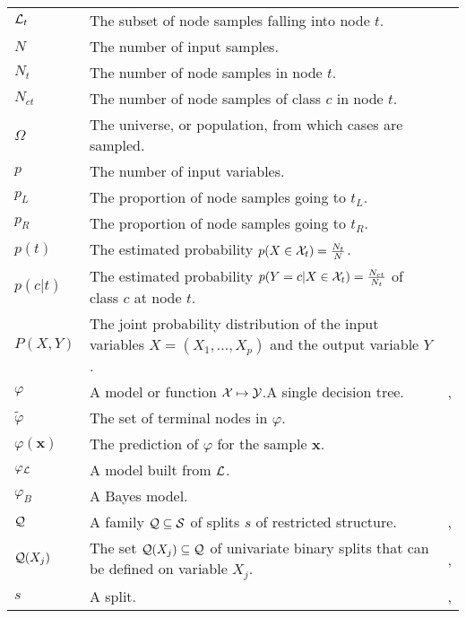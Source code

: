 {\begin{tabularx}{\textwidth}{ l X l }
${\cal L}_t$ & The subset of node samples falling into node $t$. & \pageref{ntn:L_t} \\
$N$ & The number of input samples. & \pageref{ntn:N} \\
$N_t$ & The number of node samples in node $t$. & \pageref{ntn:N_t} \\
$N_{ct}$ & The number of node samples of class $c$ in node $t$. & \pageref{ntn:N_ct} \\
$\Omega$ & The universe, or population, from which cases are sampled. & \pageref{ntn:omega} \\
$p$ & The number of input variables. & \pageref{ntn:p} \\
$p_L$ & The proportion of node samples going to $t_L$. & \pageref{ntn:p_L} \\
$p_R$ & The proportion of node samples going to $t_R$. & \pageref{ntn:p_R} \\
$p(t)$ & The estimated probability $p(X \in {\cal X}_t)=\tfrac{N_t}{N}$. & \pageref{ntn:p_t} \\
$p(c|t)$ & The estimated probability $p(Y=c | X \in {\cal X}_t)=\tfrac{N_{ct}}{N_t}$ of class $c$ at node $t$. & \pageref{ntn:p_ct} \\
$P(X,Y)$ & The joint probability distribution of the input variables $X=(X_1,\dots,X_p)$ and the output variable $Y$. & \pageref{ntn:P_XY} \\
$\varphi$ & A model or function ${\cal X} \mapsto {\cal Y}$.\newline A single decision tree. & \pageref{ntn:varphi}, \pageref{ntn:tree} \\
$\widetilde{\varphi}$ & The set of terminal nodes in $\varphi$. & \pageref{ntn:varphi-leafs}\\
$\varphi(\mathbf{x})$ & The prediction of $\varphi$ for the sample $\mathbf{x}$. & \pageref{ntn:varphi-x} \\
$\varphi_{\cal L}$ & A model built from ${\cal L}$. & \pageref{ntn:varphi-L} \\
$\varphi_B$ & A Bayes model. & \pageref{ntn:varphi-B} \\
${\cal Q}$ & A family ${\cal Q} \subseteq {\cal S}$ of splits $s$ of restricted structure. & \pageref{ntn:Q}, \pageref{ntn:Q2} \\
${\cal Q}(X_j)$ & The set ${\cal Q}(X_j) \subseteq {\cal Q}$ of univariate binary splits that can be defined on variable $X_j$. & \pageref{ntn:Q_X_j}, \pageref{ntn:Q_X_j2} \\
$s$ & A split. & \pageref{ntn:s}, \pageref{ntn:s2} \\

\end{tabularx}}
